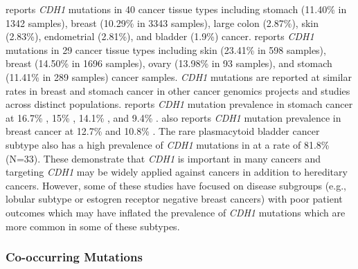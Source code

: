 \citet{COSMICdb} reports \textit{CDH1} \glspl{mutation} in 40 cancer tissue types including stomach (11.40\% in 1342 samples), breast (10.29\% in 3343 samples), large colon (2.87\%), skin (2.83\%), endometrial (2.81\%), and bladder (1.9\%) cancer. \citet{ICGC2017web} reports \textit{CDH1} \glspl{mutation} in 29 cancer tissue types including skin (23.41\% in 598 samples), breast (14.50\% in 1696 samples), ovary (13.98\% in 93 samples), and stomach (11.41\% in 289 samples) cancer samples. \textit{CDH1} \glspl{mutation} are reported at similar rates in breast and stomach cancer in other cancer \glspl{genomic} projects and studies across distinct populations. \citet{cBioPortal} reports \textit{CDH1} \gls{mutation} prevalence in stomach cancer at 16.7\% \citep[30 samples]{Kakiuchi2014}, 15\% \citep[100 samples]{Wang2014}, 14.1\% \citep[78 samples]{Chen2015}, and 9.4\% \citep[393 samples]{TCGA2017prov}. \citet{cBioPortal} also reports \textit{CDH1} \gls{mutation} prevalence in breast cancer at 12.7\% \citep[963 samples]{TCGA2017prov} and 10.8\% \citep[2051 samples]{METABRIC2012, METABRIC2016}. The rare plasmacytoid bladder cancer subtype also has a high prevalence of \textit{CDH1} \glspl{mutation} in \citet{COSMICdb} at a rate of 81.8\% (N=33). These demonstrate that \textit{CDH1} is important in many cancers and targeting \textit{CDH1} may be widely applied against  cancers in addition to \gls{hereditary} cancers. However, some of these studies have focused on disease subgroups (e.g., lobular subtype or estogren receptor negative breast cancers) with poor patient outcomes which may have inflated the prevalence of \textit{CDH1} \glspl{mutation} which are more common in some of these subtypes.

\subsubsection{Co-occurring Mutations}


